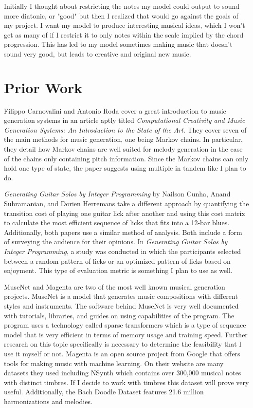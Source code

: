 \documentclass[10pt,twocolumn]{article}
\begin{document}
        Initially I thought about restricting the notes my model could output to sound more diatonic, or "good" but then I realized that would go against the goals of my project. I want my model to produce interesting musical ideas, which I won't get as many of if I restrict it to only notes within the scale implied by the chord progression. This has led to my model sometimes making music that doesn't sound very good, but leads to creative and original new music.
        
\section{Prior Work}
    Filippo Carnovalini and Antonio Roda cover a great introduction to music generation systems in an article aptly titled \textit{Computational Creativity and Music Generation Systems: An Introduction to the State of the Art}\cite{Markov}. They cover seven of the main methods for music generation, one being Markov chains. In particular, they detail how Markov chains are well suited for melody generation in the case of the chains only containing pitch information. Since the Markov chains can only hold one type of state, the paper suggests using multiple in tandem like I plan to do.\newline
    
    \textit{Generating Guitar Solos by Integer Programming} by Nailson Cunha, Anand Subramanian, and Dorien Herremans take a different approach by quantifying the transition cost of playing one guitar lick after another and using this cost matrix to calculate the most efficient sequence of licks that fits into a 12-bar blues\cite{Guitar}. Additionally, both papers use a similar method of analysis. Both include a form of surveying the audience for their opinions. In \textit{Generating Guitar Solos by Integer Programming}, a study was conducted in which the participants selected between a random pattern of licks or an optimized pattern of licks based on enjoyment. This type of evaluation metric is something I plan to use as well. \newline
    
    MuseNet and Magenta are two of the most well known musical generation projects. MuseNet is a model that generates music compositions with different styles and instruments. The software behind MuseNet is very well documented with tutorials, libraries, and guides on using capabilities of the program. The program uses a technology called sparse transformers which is a type of sequence model that is very efficient in terms of memory usage and training speed\cite{SparceTransformers}. Further research on this topic specifically is necessary to determine the feasibility that I use it myself or not\cite{MuseNet}. Magenta is an open source project from Google that offers tools for making music with machine learning. On their website are many datasets they used including NSynth which contains over 300,000 musical notes with distinct timbres. If I decide to work with timbres this dataset will prove very useful. Additionally, the Bach Doodle Dataset features 21.6 million harmonizations and melodies\cite{Magenta}.
\end{document}
